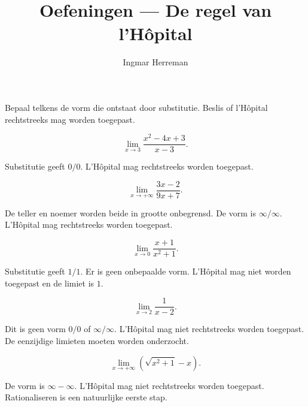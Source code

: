 \documentclass{ximera}
\title{Oefeningen — De regel van l'Hôpital}
\author{Ingmar Herreman}
\begin{document}

\maketitle
\FVDbeginExercises





\begin{oefening}{\oefB\ESS}

Bepaal telkens de vorm die ontstaat door substitutie. Beslis of
l'Hôpital rechtstreeks mag worden toegepast.

\begin{question}
\[\lim_{x\to3}\frac{x^2-4x+3}{x-3}.\]

\begin{oplossing}
Substitutie geeft \(0/0\). L'Hôpital mag rechtstreeks worden toegepast.
\end{oplossing}
\end{question}

\begin{question}
\[\lim_{x\to+\infty}\frac{3x-2}{9x+7}.\]

\begin{oplossing}
De teller en noemer worden beide in grootte onbegrensd. De vorm is
\(\infty/\infty\). L'Hôpital mag rechtstreeks worden toegepast.
\end{oplossing}
\end{question}

\begin{question}
\[\lim_{x\to0}\frac{x+1}{x^2+1}.\]

\begin{oplossing}
Substitutie geeft \(1/1\). Er is geen onbepaalde vorm. L'Hôpital mag
niet worden toegepast en de limiet is \(1\).
\end{oplossing}
\end{question}

\begin{question}
\[\lim_{x\to2}\frac1{x-2}.\]

\begin{oplossing}
Dit is geen vorm \(0/0\) of \(\infty/\infty\). L'Hôpital mag niet
rechtstreeks worden toegepast. De eenzijdige limieten moeten worden
onderzocht.
\end{oplossing}
\end{question}

\begin{question}
\[\lim_{x\to+\infty}\left(\sqrt{x^2+1}-x\right).\]

\begin{oplossing}
De vorm is \(\infty-\infty\). L'Hôpital mag niet rechtstreeks worden
toegepast. Rationaliseren is een natuurlijke eerste stap.
\end{oplossing}
\end{question}
\end{oefening}
\end{document}
